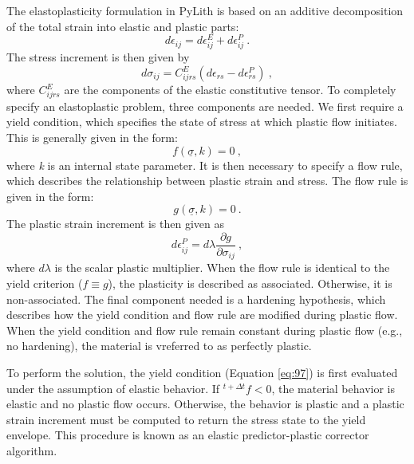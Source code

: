 The elastoplasticity formulation in PyLith is based on an additive
decomposition of the total strain into elastic and plastic parts:
\begin{equation}
d\epsilon_{ij}=d\epsilon_{ij}^{E}+d\epsilon_{ij}^{P}\:.\label{eq:95}
\end{equation}
The stress increment is then given by
\begin{equation}
d\sigma_{ij}=C_{ijrs}^{E}\left(d\epsilon_{rs}-d\epsilon_{rs}^{P}\right)\:,\label{eq:96}
\end{equation}
where $C_{ijrs}^{E}$ are the components of the elastic constitutive
tensor. To completely specify an elastoplastic problem, three components
are needed. We first require a yield condition, which specifies the
state of stress at which plastic flow initiates. This is generally
given in the form:
\begin{equation}
f\left(\underline{\sigma},k\right)=0\:,\label{eq:97}
\end{equation}
where \textit{k} is an internal state parameter. It is then necessary
to specify a flow rule, which describes the relationship between plastic
strain and stress. The flow rule is given in the form:
\begin{equation}
g\left(\underline{\sigma},k\right)=0\:.\label{eq:98}
\end{equation}
The plastic strain increment is then given as
\begin{equation}
d\epsilon_{ij}^{P}=d\lambda\frac{\partial g}{\partial\sigma_{ij}}\:,\label{eq:99}
\end{equation}
where $d\lambda$ is the scalar plastic multiplier. When the flow
rule is identical to the yield criterion ($f\equiv g$), the plasticity
is described as associated. Otherwise, it is non-associated. The final
component needed is a hardening hypothesis, which describes how the
yield condition and flow rule are modified during plastic flow. When
the yield condition and flow rule remain constant during plastic flow
(e.g., no hardening), the material is vreferred to as perfectly plastic.

To perform the solution, the yield condition (Equation \vref{eq:97})
is first evaluated under the assumption of elastic behavior. If $^{t+\Delta t}f<0$,
the material behavior is elastic and no plastic flow occurs. Otherwise,
the behavior is plastic and a plastic strain increment must be computed
to return the stress state to the yield envelope. This procedure is
known as an elastic predictor-plastic corrector algorithm.


